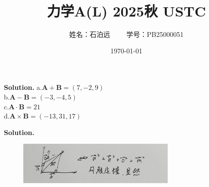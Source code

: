 \documentclass[12pt, a4paper, oneside]{ctexart}
\title{\textbf{力学A(L) 2025秋 USTC}}
\author{姓名：石泊远$ \hspace{1cm} $学号：PB25000051}
\date{\today}
\newenvironment{solution}{\par\noindent\textbf{Solution. }}{\par}
\begin{document}
	\maketitle
	
	\begin{solution}
		a.$ \bm{A} + \bm{B} = ( 7,-2,9 )$ \\
		b.$ \bm{A} - \bm{B} = ( -3,-4,5 ) $ \\
		c.$ \bm{A} \cdot \bm{B} = 21 $ \\
		d.$ \bm{A} \times \bm{B} = ( -13,31,17 ) $
	\end{solution}
	
	\begin{solution}
		\begin{figure}[h]
			\centering
			\includegraphics[width=0.7\textwidth]{72A71686E54C3E9870F55C330E117C8B.png}
		\end{figure}
	\end{solution}
	
\end{document}
